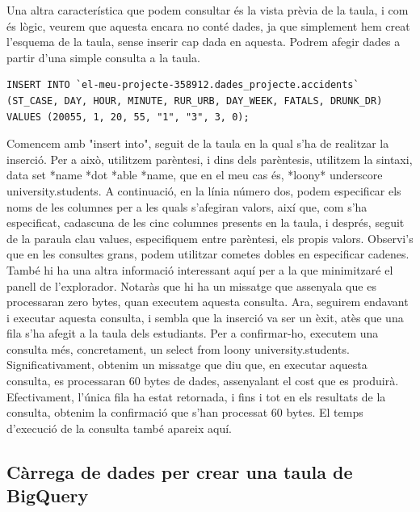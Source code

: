 \documentclass[12pt,longbibliography]{article}
\theoremstyle{definition}
\theoremstyle{remark}
\begin{document}
Una altra característica que podem consultar és la vista prèvia de la taula, i com és lògic, veurem que aquesta encara no conté dades, ja que simplement hem creat l'esquema de la taula, sense inserir cap dada en aquesta. Podrem afegir dades a partir d'una simple consulta a la taula.

\begin{verbatim}
INSERT INTO `el-meu-projecte-358912.dades_projecte.accidents` 
(ST_CASE, DAY, HOUR, MINUTE, RUR_URB, DAY_WEEK, FATALS, DRUNK_DR)
VALUES (20055, 1, 20, 55, "1", "3", 3, 0);
\end{verbatim}

Comencem amb "insert into", seguit de la taula en la qual s'ha de realitzar la inserció. Per a això, utilitzem parèntesi, i dins dels parèntesis, utilitzem la sintaxi, data set *name *dot *able *name, que en el meu cas és, *loony* underscore university.students. A continuació, en la línia número dos, podem especificar els noms de les columnes per a les quals s'afegiran valors, així que, com s'ha especificat, cadascuna de les cinc columnes presents en la taula, i després, seguit de la paraula clau values, especifiquem entre parèntesi, els propis valors. Observi's que en les consultes grans, podem utilitzar cometes dobles en especificar cadenes. També hi ha una altra informació interessant aquí per a la que minimitzaré el panell de l'explorador. Notaràs que hi ha un missatge que assenyala que es processaran zero bytes, quan executem aquesta consulta. Ara, seguirem endavant i executar aquesta consulta, i sembla que la inserció va ser un èxit, atès que una fila s'ha afegit a la taula dels estudiants. Per a confirmar-ho, executem una consulta més, concretament, un select from loony university.students. Significativament, obtenim un missatge que diu que, en executar aquesta consulta, es processaran 60 bytes de dades, assenyalant el cost que es produirà. Efectivament, l'única fila ha estat retornada, i fins i tot en els resultats de la consulta, obtenim la confirmació que s'han processat 60 bytes. El temps d'execució de la consulta també apareix aquí.

\subsection{Càrrega de dades per crear una taula de BigQuery}
\end{document}
